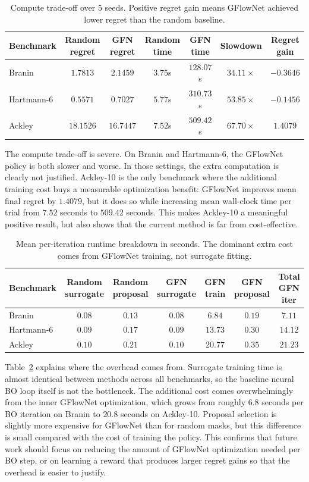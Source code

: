 \documentclass{article}
\begin{document}
\begin{table}[t]
\centering
\caption{Compute trade-off over 5 seeds. Positive regret gain means GFlowNet achieved lower regret than the random baseline.}
\label{tab:compute_tradeoff}
\small
\begin{tabular}{lcccccc}
\toprule
Benchmark & Random regret & GFN regret & Random time & GFN time & Slowdown & Regret gain \\
\midrule
Branin & $1.7813$ & $2.1459$ & $3.75$s & $128.07$s & $34.11\times$ & $-0.3646$ \\
Hartmann-6 & $0.5571$ & $0.7027$ & $5.77$s & $310.73$s & $53.85\times$ & $-0.1456$ \\
Ackley & $18.1526$ & $16.7447$ & $7.52$s & $509.42$s & $67.70\times$ & $1.4079$ \\
\bottomrule
\end{tabular}
\end{table}

The compute trade-off is severe. On Branin and Hartmann-6, the GFlowNet policy is both slower and worse. In those settings, the extra computation is clearly not justified. Ackley-10 is the only benchmark where the additional training cost buys a measurable optimization benefit: GFlowNet improves mean final regret by $1.4079$, but it does so while increasing mean wall-clock time per trial from $7.52$ seconds to $509.42$ seconds. This makes Ackley-10 a meaningful positive result, but also shows that the current method is far from cost-effective.

\begin{table}[t]
\centering
\caption{Mean per-iteration runtime breakdown in seconds. The dominant extra cost comes from GFlowNet training, not surrogate fitting.}
\label{tab:runtime_breakdown}
\small
\begin{tabular}{lcccccc}
\toprule
Benchmark & Random surrogate & Random proposal & GFN surrogate & GFN train & GFN proposal & Total GFN iter \\
\midrule
Branin & $0.08$ & $0.13$ & $0.08$ & $6.84$ & $0.19$ & $7.11$ \\
Hartmann-6 & $0.09$ & $0.17$ & $0.09$ & $13.73$ & $0.30$ & $14.12$ \\
Ackley & $0.10$ & $0.21$ & $0.10$ & $20.77$ & $0.35$ & $21.23$ \\
\bottomrule
\end{tabular}
\end{table}

Table~\ref{tab:runtime_breakdown} explains where the overhead comes from. Surrogate training time is almost identical between methods across all benchmarks, so the baseline neural BO loop itself is not the bottleneck. The additional cost comes overwhelmingly from the inner GFlowNet optimization, which grows from roughly $6.8$ seconds per BO iteration on Branin to $20.8$ seconds on Ackley-10. Proposal selection is slightly more expensive for GFlowNet than for random masks, but this difference is small compared with the cost of training the policy. This confirms that future work should focus on reducing the amount of GFlowNet optimization needed per BO step, or on learning a reward that produces larger regret gains so that the overhead is easier to justify.
\end{document}
